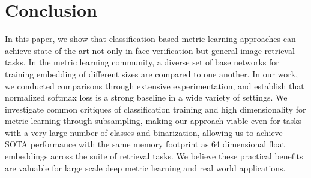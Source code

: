 \documentclass{bmvc2k}
\begin{document}
 
\section{Conclusion}
In this paper, we show that classification-based metric learning approaches can achieve state-of-the-art not only in face verification but general image retrieval tasks. In the metric learning community, a diverse set of base networks for training embedding of different sizes are compared to one another. In our work, we conducted comparisons through extensive experimentation, and establish that normalized softmax loss is a strong baseline in a wide variety of settings. 
We investigate common critiques of classification training and high dimensionality for metric learning through subsampling, making our approach viable even for tasks with a very large number of classes and binarization, allowing us to achieve SOTA performance with  the  same  memory  footprint  as  64  dimensional float embeddings across the suite of retrieval tasks. We believe these practical benefits are valuable for large scale deep metric learning and real world applications. 

\end{document}
